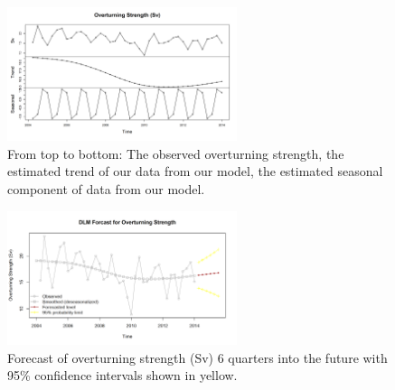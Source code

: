 \begin{figure}[H]
    \centering
    \includegraphics[width=0.60\textwidth]{Sections/DLM/Plots/trends.png}
    \caption{From top to bottom: The observed overturning strength, the estimated trend of our data from our model, the estimated seasonal component of data from our model.}
    \label{S3fig:trend}
\end{figure}

\begin{figure}[H]
    \centering
    \includegraphics[width=0.60\textwidth]{Sections/DLM/Plots/forecast.png}
    \caption{Forecast of overturning strength (Sv) 6 quarters into the future with 95\% confidence intervals shown in yellow.}
    \label{S3fig:Forecast}
\end{figure}